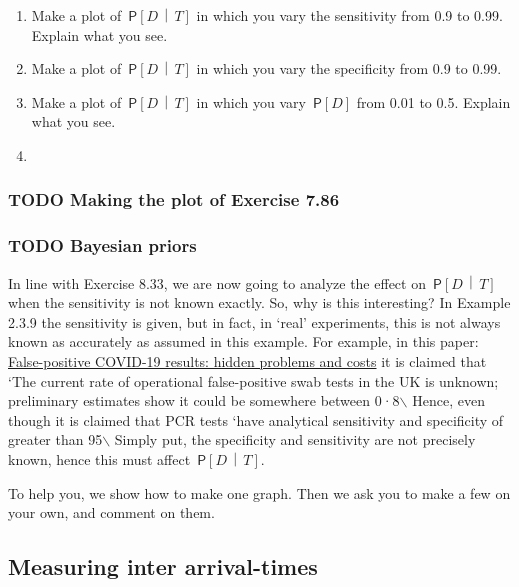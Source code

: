 \documentclass[a4paper]{article}
\theoremstyle{definition}
\newcommand{\given}{\,\middle|\,}
\renewcommand{\P}[1]{\,\mathsf{P}\left[#1\right]}
\newcommand{\1}[1]{\,I_{#1}} %
\begin{document}
\begin{enumerate}
\item Make a plot of \(\P{D\given T}\) in which you vary the sensitivity from 0.9 to 0.99. Explain what you see.
\item Make a plot of \(\P{D\given T}\) in which you vary the specificity from 0.9 to 0.99.
\item Make a plot of \(\P{D\given T}\) in which you vary \(\P{D}\) from 0.01 to 0.5. Explain what you see.
\item 
\end{enumerate}



\subsubsection{{\bfseries\sffamily TODO} Making the plot of Exercise 7.86}
\label{sec:orgf534b47}

\subsubsection{{\bfseries\sffamily TODO} Bayesian priors}
\label{sec:orgac48e35}

In line with Exercise 8.33, we are now going to analyze the effect on \(\P{D\given T}\) when the sensitivity is not known exactly.
So, why is this interesting?
In Example 2.3.9 the sensitivity is given, but in fact, in `real' experiments, this is not always known as accurately as assumed in this example.
For example, in this paper: \href{https://www.thelancet.com/journals/lanres/article/PIIS2213-2600(20)30453-7/fulltext}{False-positive COVID-19 results: hidden problems and costs} it is claimed that `The current rate of operational false-positive swab tests in the UK is unknown; preliminary estimates show it could be somewhere between 0·8$\backslash$%
Hence, even though it is claimed that PCR tests `have analytical sensitivity and specificity of greater than 95$\backslash$%
Simply put, the specificity and sensitivity are not precisely known, hence this must affect \(\P{D\given T}\).

To help you, we show how to make one graph. Then we ask you to make a few on your own, and comment on them.



\subsection{Measuring inter arrival-times}
\label{sec:orgf820334}
\end{document}
